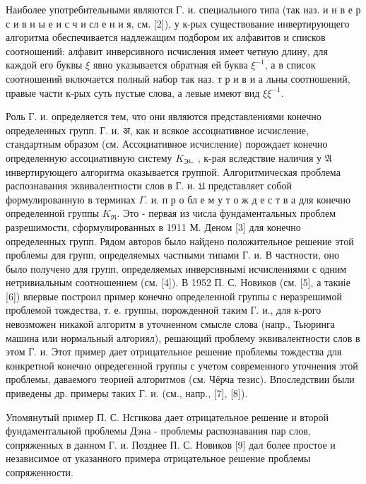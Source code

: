 \documentclass[10pt]{article}
\begin{document}
Наиболее употребительными являются Г. и. специального типа (так наз. и н в е р с и в н ы е и с ч и сл е н и я, см. [2]), у к-рых существование инвертирующего алгоритма обеспечивается надлежащим подбором их алфавитов и списков соотношений: алфавит инверсивного исчисления имеет четную длину, для каждой его буквы $\xi$ явно указывается обратная ей буква $\xi^{-1}$, а в список соотношений включается полный набор так наз. т р и в и а льны соотношений, правые части к-рых суть пустые слова, а левые имеют вид $\xi \xi^{-1}$.



Роль Г. и. определяется тем, что они являются представлениями конечно определенных групп. Г. и. अ, как и всякое ассоциативное исчисление, стандартным образом (см. Ассоциативное исчисление) порождает конечно определенную ассоциативную систему $K_{\text {Эㄴ }}$, к-рая вследствие наличия у $\mathfrak{A}$ инвертирующего алгоритма оказывается группой. Алгоритмическая проблема распознавания эквивалентности слов в Г. и. $\mathfrak{U}$ представляет собой формулированную в терминах $\Gamma$. и. п р о бл е м у т о ж д е с т в а для конечно определенной группы $K_{\Re}$. Это - первая из числа фундаментальных проблем разрешимости, сформулированных в 1911 М. Деном [3] для конечно определенных групп. Рядом авторов было найдено положительное решение этой проблемы для групп, определяемых частными типами Г. и. В частности, оно было получено для групп, определяемых инверсивнымі исчислениями с одним нетривиальным соотношением (см. [4]). В 1952 П. С. Новиков (см. [5], а такиіе [6]) впервые построил пример конечно определенной группы с неразрешимой проблемой тождества, т. е. группы, порожденной таким $Г$. и., для к-рого невозможен никакой алгоритм в уточненном смысле слова (напр., Тьюринга машина или нормальный алгориял), решающий проблему эквивалентности слов в этом Г. и. Этот пример дает отрицательное решение проблемы тождества для конкретной конечно опредегенной группы с учетом современного уточнения этой проблемы, даваемого теорией алгоритмов (см. Чёрча тезис). Впоследствии были приведены др. примеры таких Г. и. (см., напр., [7], [8]).



Упомянутый пример П. С. Нсгикова дает отрицательное решение и второй фундаментальной проблемы Дэна - проблемы распознавания пар слов, сопряженных в данном Г. и. Позднее П. С. Новиков [9] дал более простое и независимое от указанного примера отрицательное решение проблемы сопряженности.
\end{document}

